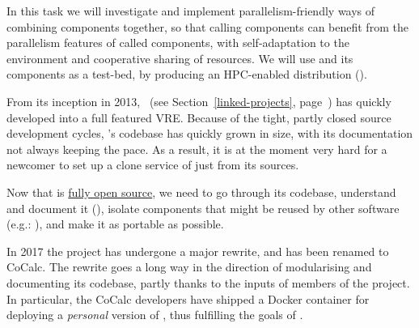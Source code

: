 \begin{workpackage}[id=component-architecture,wphases=0-48!.5,
  title=Component Architecture,lead=UV,
  PSRM=46,UVRM=8,SARM=16, USORM=6, UORM=19, LLRM=14, UJFRM=6, UGRM=14]
\begin{tasklist}
\begin{task}[title=Component architecture for High Performance Computing and Parallelism,id=component-for-HPC,PM=12,wphases=36-48,lead=UJF,partners=SA,issue=54]
    In this task we will investigate and implement
    parallelism-friendly ways of combining components together, so
    that calling components can benefit from the parallelism features
    of called components, with self-adaptation to the environment and
    cooperative sharing of resources. We will use \Sage and its
    components as a test-bed, by producing an HPC-enabled distribution
    ().
  \end{task}

  \begin{task}[title=Document and modularise \SMC's codebase,id=extract-smc,lead=PS,PM=10,partners={UV,UG},wphases=0-24,issue=55]
    From its inception in 2013, \SMC\ (see Section~\ref{linked-projects}, page~\pageref{sec:SMC-page}) 
    has quickly developed into a full
    featured VRE.  Because of the tight, partly closed source
    development cycles, \SMC's codebase has quickly grown in size,
    with its documentation not always keeping the pace. As a result,
    it is at the moment very hard for a newcomer to set up a clone
    service of \SMC just from its sources.

    Now that \SMC is
    \href{https://twitter.com/sagemath/status/544939872294014977}{fully
      open source}, we need to go through its codebase, understand and
    document it
    (), isolate
    components that might be reused by other software (e.g.:
    \Jupyter), and make it as portable as possible.

    In 2017 the \SMC project has undergone a major rewrite, and has
    been renamed to CoCalc. The rewrite goes a long way in the
    direction of modularising and documenting its codebase, partly
    thanks to the inputs of members of the \ODK project. %
    In particular, the CoCalc developers have shipped a Docker
    container for deploying a \emph{personal} version of \SMC, thus
    fulfilling the goals of
    .
  \end{task}


\end{tasklist}
\end{workpackage}
